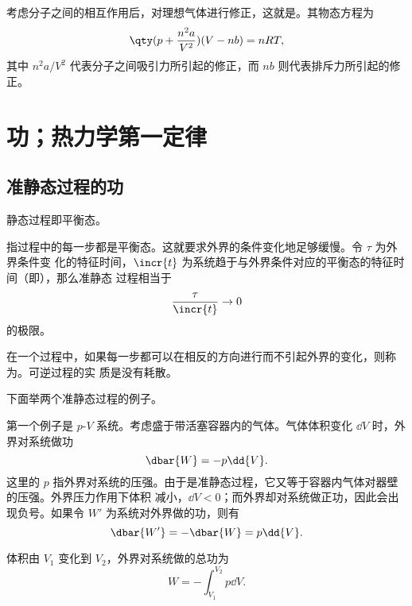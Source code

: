 考虑分子之间的相互作用后，对理想气体进行修正，这就是。其物态方程为
\begin{equation} \label{eq:van-der-waals-gas}
  \qty(p + \frac{n^2 a}{V^2}) (V - nb) = nRT,
\end{equation}
其中 $n^2 a / V^2$ 代表分子之间吸引力所引起的修正，而 $nb$ 则代表排斥力所引起的修正。

\section{功；热力学第一定律}

\subsection{准静态过程的功}

静态过程即平衡态。

指过程中的每一步都是平衡态。这就要求外界的条件变化地足够缓慢。令 $\tau$ 为外界条件变
化的特征时间，$\incr{t}$ 为系统趋于与外界条件对应的平衡态的特征时间（即），那么准静态
过程相当于
\begin{equation}
  \frac{\tau}{\incr{t}} \to 0
\end{equation}
的极限。

在一个过程中，如果每一步都可以在相反的方向进行而不引起外界的变化，则称为。可逆过程的实
质是没有耗散。

下面举两个准静态过程的例子。

第一个例子是 $p$-$\!V$ 系统。考虑盛于带活塞容器内的气体。气体体积变化 $\dd{V}$ 时，外界对系统做功
\begin{equation}
  \dbar{W} = -p \dd{V}.
\end{equation}
这里的 $p$ 指外界对系统的压强。由于是准静态过程，它又等于容器内气体对器壁的压强。外界压力作用下体积
减小，$\dd{V} < 0$；而外界却对系统做正功，因此会出现负号。如果令 $W'$ 为系统对外界做的功，则有
\begin{equation}
  \dbar{W'} = - \dbar{W} = p \dd{V}.
\end{equation}

体积由 $V_1$ 变化到 $V_2$，外界对系统做的总功为
\begin{equation}
  W = -\int_{V_1}^{V_2} p \dd{V}.
\end{equation}

